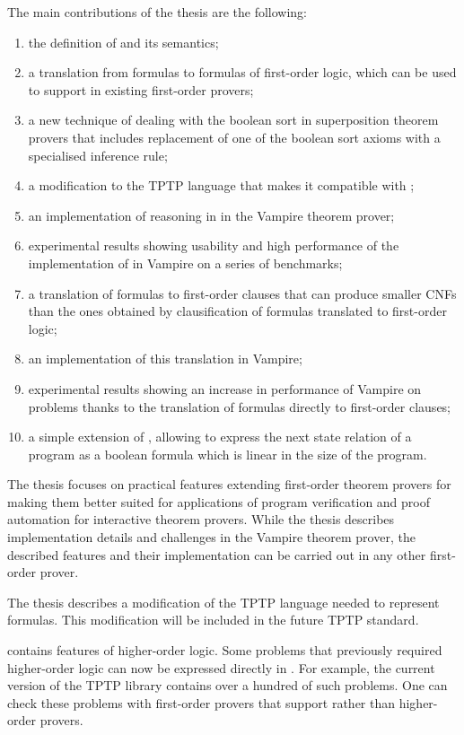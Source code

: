 The main contributions of the thesis are the following:
\begin{enumerate}
  \item the definition of \folb{} and its semantics;
  \item a translation from \folb{} formulas to formulas of first-order logic, which can be used to support \folb{} in existing first-order provers;
  \item a new technique of dealing with the boolean sort in superposition theorem provers that includes replacement of one of the boolean sort axioms with a specialised inference rule;
  \item a modification to the TPTP language that makes it compatible with \folb{};
  \item an implementation of reasoning in \folb{} in the Vampire theorem prover;
  \item experimental results showing usability and high performance of the implementation of \folb{} in Vampire on a series of benchmarks;
  \item a translation of \folb{} formulas to first-order clauses that can produce smaller CNFs than the ones obtained by clausification of \folb{} formulas translated to first-order logic;
  \item an implementation of this translation in Vampire;
  \item experimental results showing an increase in performance of Vampire on \folb{} problems thanks to the translation of \folb{} formulas directly to first-order clauses;
  \item a simple extension of \folb{}, allowing to express the next state relation of a program as a boolean formula which is linear in the size of the program.
\end{enumerate}

The thesis focuses on practical features extending first-order theorem provers for making them better suited for applications of program verification and proof automation for interactive theorem provers. While the thesis describes implementation details and challenges in the Vampire theorem prover, the described features and their implementation can be carried out in any other first-order prover.

The thesis describes a modification of the TPTP language needed to represent \folb{} formulas. This modification will be included in the future TPTP standard.

\folb{} contains features of higher-order logic. Some problems that previously required higher-order logic can now be expressed directly in \folb{}. For example, the current version of the TPTP library contains over a hundred of such problems. One can check these problems with first-order provers that support \folb{} rather than higher-order provers. 

